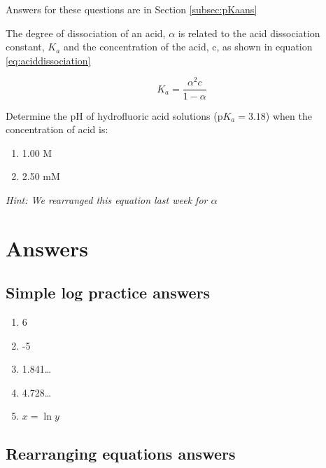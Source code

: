 \documentclass[
]{book}
\providecommand{\tightlist}{%
  \setlength{\itemsep}{0pt}\setlength{\parskip}{0pt}}
\begin{document}
Answers for these questions are in Section \ref{subsec:pKaans}

The degree of dissociation of an acid, \(\alpha\) is related to the acid dissociation constant, \(K_a\) and the concentration of the acid, c, as shown in equation \eqref{eq:aciddissociation}

\begin{equation}
K_a=\frac{\alpha ^2 c}{1-\alpha}
\label{eq:aciddissociation}
\end{equation}

Determine the pH of hydrofluoric acid solutions (p\(K_a= 3.18\)) when the concentration of acid is:

\begin{enumerate}
\def\labelenumi{\alph{enumi}.}
\tightlist
\item
  1.00 M
\item
  2.50 mM
\end{enumerate}

\emph{Hint: We rearranged this equation last week for \(\alpha\)}

\hypertarget{sec:Answers2}{%
\section{Answers}\label{sec:Answers2}}

\hypertarget{subsec:logpracticeans}{%
\subsection{Simple log practice answers}\label{subsec:logpracticeans}}

\begin{enumerate}
\def\labelenumi{\arabic{enumi}.}
\tightlist
\item
  6
\item
  -5
\item
  1.841\ldots{}
\item
  4.728\ldots{}
\item
  \(x = \ln y\)
\end{enumerate}

\hypertarget{subsec:logrearrangeans}{%
\subsection{Rearranging equations answers}\label{subsec:logrearrangeans}}
\end{document}
